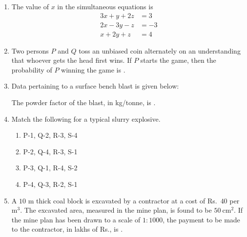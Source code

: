 \documentclass[journal]{IEEEtran}
\begin{document}
\begin{enumerate}
\hfill{}

\item The value of $x$ in the simultaneous equations is \underline{\hspace{2cm}}
\[
\begin{aligned}
3x + y + 2z &= 3 \\
2x - 3y - z &= -3 \\
x + 2y + z &= 4
\end{aligned}
\]

\hfill{}

\item Two persons $P$ and $Q$ toss an unbiased coin alternately on an understanding that whoever gets the head first wins. If $P$ starts the game, then the probability of $P$ winning the game is \underline{\hspace{2cm}}.
\hfill{}
\item Data pertaining to a surface bench blast is given below:  


\vspace{0.5em}
The powder factor of the blast, in kg/tonne, is \underline{\hspace{2cm}}.
\hfill{}
\item Match the following for a typical slurry explosive.  

\begin{center}


\end{center}

\begin{enumerate}
\item P-1, Q-2, R-3, S-4
    \item P-2, Q-4, R-3, S-1
    \item P-3, Q-1, R-4, S-2
    \item P-4, Q-3, R-2, S-1
\end{enumerate}
\hfill{}

\item A $10$ m thick coal block is excavated by a contractor at a cost of Rs.\ $40$ per m$^3$. 
The excavated area, measured in the mine plan, is found to be $50\ \mathrm{cm}^2$. 
If the mine plan has been drawn to a scale of $1\!:\!1000$, the payment to be made to the contractor, 
in lakhs of Rs., is \underline{\hspace{2cm}}.
\hfill{}


\end{enumerate}
\end{document}
